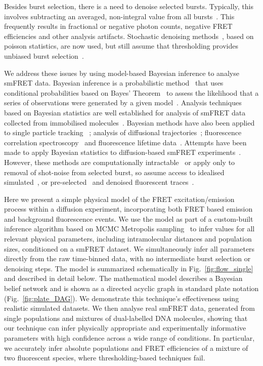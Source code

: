 Besides burst selection, there is a need to denoise selected bursts. Typically, this involves subtracting an averaged, non-integral value from all bursts~\cite{nir06}.  This frequently results in fractional or negative photon counts, negative FRET efficiencies and other analysis artifacts.  Stochastic denoising methods~\cite{kalinin2007, antonik2006, santoso10, torella11}, based on poisson statistics, are now used, but still assume that thresholding provides unbiased burst selection~\cite{kalinin2007}.  

We address these issues by using model-based Bayesian inference to analyse smFRET data.  Bayesian inference is a probabilistic method~\cite{barber12} that uses conditional probabilities based on Bayes' Theorem~\cite{bayes63} to assess the likelihood that a series of observations were generated by a given model~\cite{mackay03}.  Analysis techniques based on Bayesian statistics are well established for analysis of smFRET data collected from immobilised molecules~\cite{mckinney06, bronson09, bronson10, taylor10, taylor11, uphoff2011}. Bayesian methods have also been applied to single particle tracking ~\cite{yoon08}; analysis of diffusional trajectories~\cite{turkcan12, stigler2012}; fluorescence correlation spectroscopy~\cite{kugel12, guo11, he11, guo2014} and fluorescence lifetime data~\cite{kou05, kalinin2008}. Attempts have been made to apply Bayesian statistics to diffusion-based smFRET experiments~\cite{devore12, gopich07}.  However, these methods are computationally intractable~\cite{gopich03} or apply only to removal of shot-noise from selected burst, so assume access to idealised simulated~\cite{gopich07}, or pre-selected~\cite{devore12} and denoised fluorescent traces~\cite{kou05}.    

Here we present a simple physical model of the FRET excitation/emission process within a diffusion experiment, incorporating both FRET based emission and background fluorescence events. We use the model as part of a custom-built inference algorithm based on MCMC Metropolis sampling~\cite{hastings70} to infer values for all relevant physical parameters, including intramolecular distances and population sizes, conditioned on a smFRET dataset.  We simultaneously infer all parameters directly from the raw time-binned data, with no intermediate burst selection or denoising steps. The model is summarized schematically in Fig.~\ref{fig:flow_single} and described in detail below. The mathematical model describes a Bayesian belief network and is shown as a directed acyclic graph in standard plate notation (Fig.~\ref{fig:plate_DAG}). We demonstrate this technique's effectiveness using realistic simulated datasets.  We then analyse real smFRET data, generated from single populations and mixtures of dual-labelled DNA molecules, showing that our technique can infer physically appropriate and experimentally informative parameters with high confidence across a wide range of conditions. In particular, we accurately infer absolute populations and FRET efficiencies of a mixture of two fluorescent species, where thresholding-based techniques fail. 

